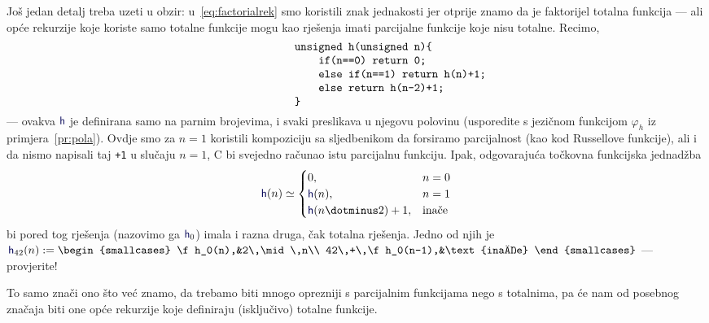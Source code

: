 Još jedan detalj treba uzeti u obzir: u~\eqref{eq:factorialrek} smo koristili znak jednakosti jer otprije znamo da je faktorijel totalna funkcija --- ali opće rekurzije koje koriste samo totalne funkcije mogu kao rješenja imati parcijalne funkcije koje nisu totalne. Recimo,
\begin{equation}\begin{minipage}{0.8\textwidth}
\begin{verbatim}
                unsigned h(unsigned n){
                    if(n==0) return 0;
                    else if(n==1) return h(n)+1;
                    else return h(n-2)+1;
                }
\end{verbatim}
\end{minipage}\end{equation}
--- ovakva $\f h$ je definirana samo na parnim  brojevima, i svaki preslikava u njegovu polovinu (usporedite s jezičnom funkcijom $\varphi_h$ iz primjera~\ref{pr:pola}). Ovdje smo za $n=1$ koristili kompoziciju sa sljedbenikom da forsiramo parcijalnost (kao kod Russellove funkcije), ali i da nismo napisali taj \texttt{+1} u slučaju $n=1$, C bi svejedno računao istu parcijalnu funkciju. Ipak, odgovarajuća točkovna funkcijska jednadžba
\vspace{-1em}
\begin{equation}\label{eq:halfmany}
    \f h(n)\simeq\begin{cases}
        0,&n=0\\
        \f h(n),&n=1\\
        \f h(n\dotminus2)+1,&\text{inače}
    \end{cases}
\end{equation}
bi pored tog rješenja (nazovimo ga $\f h_0$) imala i razna druga, čak totalna rješenja. Jedno od njih je
$
    \f h_{42}(n):=\begin{smallcases}
        \f h_0(n),&2\,\mid\,n\\
        42\,+\,\f h_0(n-1),&\text{inače}
    \end{smallcases}
$ --- provjerite!

To samo znači ono što već znamo, da trebamo biti mnogo oprezniji s parcijalnim funkcijama nego s totalnima, pa će nam od posebnog značaja biti one opće rekurzije koje definiraju (isključivo) totalne funkcije.

